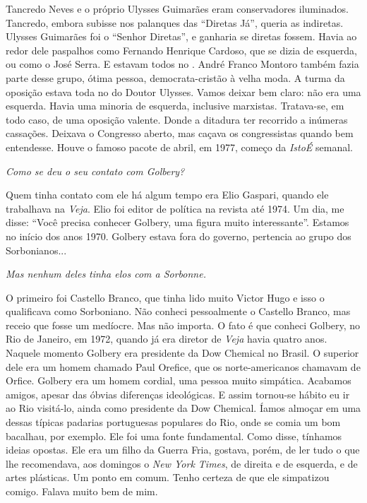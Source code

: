 \normalfont 
Tancredo Neves e o próprio Ulysses Guimarães eram
conservadores iluminados. Tancredo, embora subisse nos palanques das
``Diretas Já'', queria as indiretas. Ulysses Guimarães foi o ``Senhor
Diretas'', e ganharia se diretas fossem. Havia ao redor dele paspalhos
como Fernando Henrique Cardoso, que se dizia de esquerda, ou como o José
Serra. E estavam todos no . André Franco Montoro também fazia parte
desse grupo, ótima pessoa, democrata-cristão à velha moda. A turma da
oposição estava toda no  do Doutor Ulysses. Vamos deixar bem claro:
não era uma esquerda. Havia uma minoria de esquerda, inclusive
marxistas. Tratava-se, em todo caso, de uma oposição valente. Donde a
ditadura ter recorrido a inúmeras cassações. Deixava o Congresso aberto,
mas caçava os congressistas quando bem entendesse. Houve o famoso pacote
de abril, em 1977, começo da \emph{IstoÉ} semanal.

\itshape
 Como se deu o seu contato com Golbery?

\normalfont 
Quem tinha contato com ele há algum tempo era Elio
Gaspari, quando ele trabalhava na \emph{Veja}. Elio foi editor de
política na revista até 1974. Um dia, me disse: ``Você precisa conhecer
Golbery, uma figura muito interessante''. Estamos no início dos anos
1970. Golbery estava fora do governo, pertencia ao grupo dos
Sorbonianos...

\itshape
 Mas nenhum deles tinha elos com a Sorbonne.

\normalfont 
O primeiro foi Castello Branco, que tinha lido muito
Victor Hugo e isso o qualificava como Sorboniano. Não conheci
pessoalmente o Castello Branco, mas receio que fosse um medíocre. Mas
não importa. O fato é que conheci Golbery, no Rio de Janeiro, em 1972,
quando já era diretor de \emph{Veja} havia quatro anos. Naquele momento
Golbery era presidente da Dow Chemical no Brasil. O superior dele era um
homem chamado Paul Orefice, que os norte-americanos chamavam de Orfice.
Golbery era um homem cordial, uma pessoa muito simpática. Acabamos
amigos, apesar das óbvias diferenças ideológicas. E assim tornou-se
hábito eu ir ao Rio visitá-lo, ainda como presidente da Dow Chemical.
Íamos almoçar em uma dessas típicas padarias portuguesas populares do
Rio, onde se comia um bom bacalhau, por exemplo. Ele foi uma fonte
fundamental. Como disse, tínhamos ideias opostas. Ele era um filho da
Guerra Fria, gostava, porém, de ler tudo o que lhe recomendava, aos
domingos o \emph{New York Times}, de direita e de esquerda, e de artes
plásticas. Um ponto em comum. Tenho certeza de que ele simpatizou
comigo. Falava muito bem de mim.

